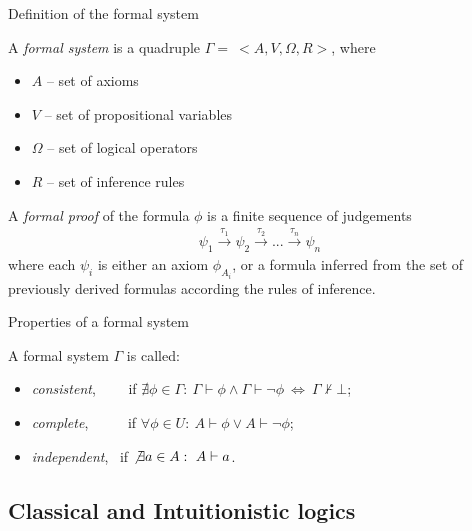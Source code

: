 \documentclass[aspectratio=169, 12pt, fleqn]{beamer}
\begin{document}
\begin{frame}{Definition of the formal system}

A \textit{formal system} is a quadruple $\Gamma = \ <A, V, \Omega, R>$, where
\begin{itemize}
  \item $A$ -- set of axioms
  \item $V$ -- set of propositional variables
  \item $\Omega$ -- set of logical operators
  \item $R$ -- set of inference rules
\end{itemize} 

\vspace{15pt}

A \textit{formal proof} of the formula $\phi$ is a finite sequence of judgements 
\begin{align*}
\psi_1 \xrightarrow{\tau_1} \psi_2 \xrightarrow{\tau_2} ... \xrightarrow{\tau_n} \psi_n 
\end{align*}
where each $\psi_i$ is either an axiom $\phi_{A_i}$, or a formula inferred from the set of previously derived formulas according the rules of inference.


\end{frame}


\begin{frame}{Properties of a formal system}

A formal system $\Gamma$ is called:
\begin{itemize}
\item  \textit{consistent}, \ \ \ \ if $\nexists \phi \in \Gamma: \ \Gamma \vdash \phi \land  \Gamma \vdash \neg \phi  \ \Leftrightarrow \ \Gamma \nvdash \bot$; 
\\ \vspace{3pt}
\item \textit{complete}, \ \ \ \ \ if $\forall \phi \in U: \ A \vdash \phi \lor A \vdash \neg \phi$;
\\ \vspace{3pt}
\item \textit{independent}, \ if $\not \exists a \in A: \ A \vdash a$.
\end{itemize}

\end{frame}


\subsection{Classical and Intuitionistic logics}
\end{document}
